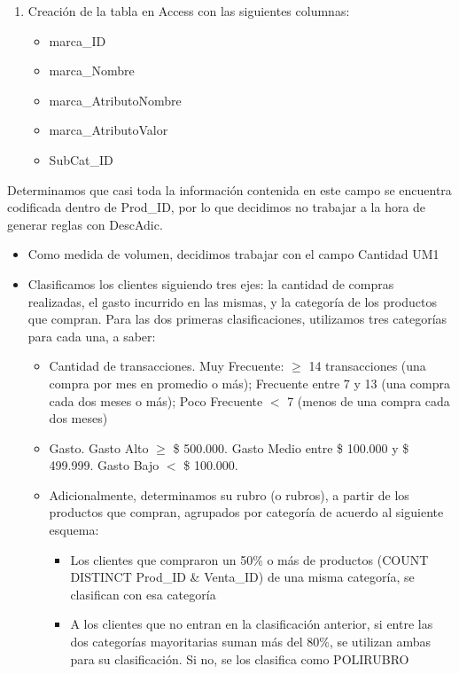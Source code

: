 \documentclass[]{article}
\begin{document}
\begin{itemize}
\begin{enumerate}
		\item Creación de la tabla en Access con las siguientes columnas:
		\begin{itemize}
			\item marca\_ID
			\item marca\_Nombre
			\item marca\_AtributoNombre
			\item marca\_AtributoValor
			\item SubCat\_ID	
		\end{itemize}	
		
	\end{enumerate}
	
	
\end{itemize}



Determinamos que casi toda la información contenida en este campo se encuentra codificada dentro de Prod\_ID, por lo que decidimos no trabajar a la hora de generar reglas con DescAdic.\\

\begin{itemize}
	\item Como medida de volumen, decidimos trabajar con el campo Cantidad UM1
	\item Clasificamos los clientes siguiendo tres ejes: la cantidad de compras realizadas, el gasto incurrido en las mismas, y la categoría de los productos que compran. Para las dos primeras clasificaciones, utilizamos tres categorías para cada una, a saber:
	
	\begin{itemize}
		\item Cantidad de transacciones. Muy Frecuente: $\geq$ 14 transacciones (una compra por mes en promedio o más); Frecuente entre 7 y 13 (una compra cada dos meses o más); Poco Frecuente $<$ 7 (menos de una compra cada dos meses)
		\item Gasto. Gasto Alto $\geq$ \$ 500.000. Gasto Medio entre \$ 100.000 y \$ 499.999. Gasto Bajo $<$ \$ 100.000.
		\item Adicionalmente, determinamos su rubro (o rubros), a partir de los productos que compran, agrupados por categoría de acuerdo al siguiente esquema:
		\begin{itemize}
			\item Los clientes que compraron un 50\% o más de productos (COUNT DISTINCT Prod\_ID \& Venta\_ID) de una misma categoría, se clasifican con esa categoría
			
			\item A los clientes que no entran en la clasificación anterior, si entre las dos categorías mayoritarias suman más del 80\%, se utilizan ambas para su clasificación. Si no, se los clasifica como POLIRUBRO
		\end{itemize}
	\end{itemize}

\end{itemize}
\end{document}
